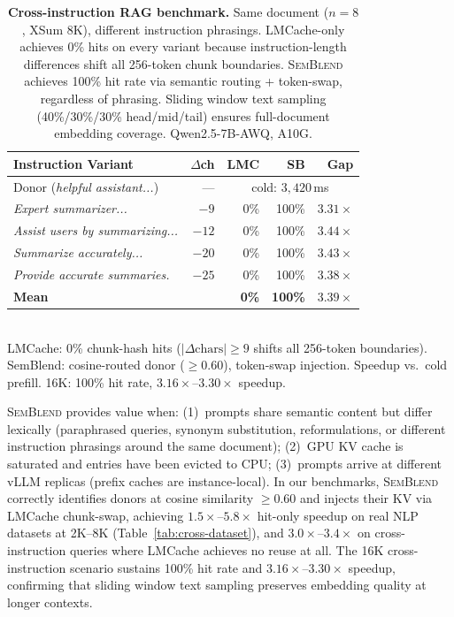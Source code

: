 \documentclass[10pt,twocolumn]{article}
\newcommand{\semblend}{\textsc{SemBlend}\xspace}
\begin{document}
\begin{table}[t]
\centering
\caption{\textbf{Cross-instruction RAG benchmark.} Same document ($n{=}8$,
XSum 8K), different instruction phrasings. LMCache-only achieves 0\% hits
on every variant because instruction-length differences shift all 256-token
chunk boundaries. \semblend achieves 100\% hit rate via semantic routing
+ token-swap, regardless of phrasing. Sliding window text sampling
(40\%/30\%/30\% head/mid/tail) ensures full-document embedding coverage.
Qwen2.5-7B-AWQ, A10G.}
\label{tab:cross-instruction}
\scriptsize
\setlength{\tabcolsep}{2pt}
\begin{tabular}{@{}p{3.6cm}rrrr@{}}
\toprule
\textbf{Instruction Variant} & \textbf{$\Delta$ch} & \textbf{LMC} & \textbf{SB} & \textbf{Gap} \\
\midrule
Donor (\emph{helpful assistant...}) & ---  & \multicolumn{3}{c}{cold: $3{,}420$\,ms} \\
\midrule
\emph{Expert summarizer...} & $-9$  & 0\%  & 100\%  & $3.31\times$ \\
\emph{Assist users by summarizing...} & $-12$ & 0\%  & 100\%  & $3.44\times$ \\
\emph{Summarize accurately...}  & $-20$ & 0\%  & 100\%  & $3.43\times$ \\
\emph{Provide accurate summaries.}    & $-25$ & 0\%  & 100\%  & $3.38\times$ \\
\midrule
\textbf{Mean} & & \textbf{0\%} & \textbf{100\%} & $\mathbf{3.39\times}$ \\
\bottomrule
\end{tabular}\\[2pt]
{\scriptsize LMCache: 0\% chunk-hash hits ($|\Delta\text{chars}|{\geq}9$
shifts all 256-token boundaries). SemBlend: cosine-routed donor
(${\geq}0.60$), token-swap injection. Speedup vs.\ cold prefill.
16K: 100\% hit rate, $3.16\times$--$3.30\times$ speedup.}
\end{table}

\semblend provides value when:
(1)~prompts share semantic content but differ lexically
(paraphrased queries, synonym substitution, reformulations, or
different instruction phrasings around the same document);
(2)~GPU KV cache is saturated and entries have been evicted to CPU;
(3)~prompts arrive at different vLLM replicas (prefix caches are
instance-local). In our benchmarks, \semblend correctly identifies
donors at cosine similarity $\geq 0.60$ and injects their KV via
LMCache chunk-swap, achieving $1.5\times$--$5.8\times$ hit-only speedup
on real NLP datasets at 2K--8K (Table~\ref{tab:cross-dataset}), and
$3.0\times$--$3.4\times$ on cross-instruction queries where LMCache
achieves no reuse at all.
The 16K cross-instruction scenario sustains 100\% hit rate and
$3.16\times$--$3.30\times$ speedup, confirming that sliding window
text sampling preserves embedding quality at longer contexts.
\end{document}
